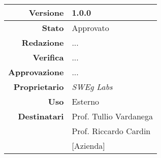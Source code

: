 \begin{center}
\begin{tabular}{r|l}
    \textbf{Versione} & 1.0.0 \\
    \hline
    \textbf{Stato} & Approvato \\
    \hline
    \textbf{Redazione} & ... \\
    \hline
    \textbf{Verifica} & ... \\
    \hline
    \textbf{Approvazione} & ... \\
    \hline
    \textbf{Proprietario} & \emph{SWEg Labs} \\
    \hline
    \textbf{Uso} & Esterno \\
    \hline
    \textbf{Destinatari} & Prof. Tullio Vardanega \\
                            & Prof. Riccardo Cardin \\
                            & [Azienda] \\
\end{tabular}
\end{center}
    
